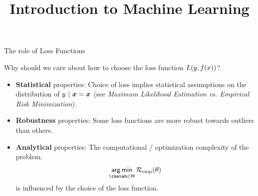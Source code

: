 





\usepackage{booktabs}

\newcommand{\titlefigure}{figure_man/vgg_example.png}
\newcommand{\learninggoals}{
  \item Know the concept of robustness 
  \item Learn about analytical and computational properties of loss functions 
  \item Understand that the loss function may influence convergence of the optimizer
}

\title{Introduction to Machine Learning}
\date{}





\begin{vbframe}{The role of Loss Functions}

Why should we care about how to choose the loss function $L(y, f(x))$?

\begin{itemize}
\item \textbf{Statistical} properties: Choice of loss implies statistical assumptions on the distribution of $y ~|~ \bm{x} = \bm{x}$ (see \emph{Maximum Likelihood Estimation vs.
Empirical Risk Minimization}). 
\item \textbf{Robustness} properties: Some loss functions are more robust towards outliers than others. 
\item \textbf{Analytical} properties: The computational / optimization complexity of the problem. 
$$
\argmin_{\thetab \in \Theta} \risket
$$
is influenced by the choice of the loss function. 
\end{itemize}

\end{vbframe}


